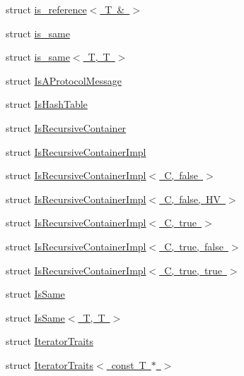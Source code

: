 \begin{DoxyCompactItemize}
struct \mbox{\hyperlink{structtesting_1_1internal_1_1is__reference_3_01_t_01_6_01_4}{is\+\_\+reference$<$ T \& $>$}}
\item 
struct \mbox{\hyperlink{structtesting_1_1internal_1_1is__same}{is\+\_\+same}}
\item 
struct \mbox{\hyperlink{structtesting_1_1internal_1_1is__same_3_01_t_00_01_t_01_4}{is\+\_\+same$<$ T, T $>$}}
\item 
struct \mbox{\hyperlink{structtesting_1_1internal_1_1_is_a_protocol_message}{Is\+A\+Protocol\+Message}}
\item 
struct \mbox{\hyperlink{structtesting_1_1internal_1_1_is_hash_table}{Is\+Hash\+Table}}
\item 
struct \mbox{\hyperlink{structtesting_1_1internal_1_1_is_recursive_container}{Is\+Recursive\+Container}}
\item 
struct \mbox{\hyperlink{structtesting_1_1internal_1_1_is_recursive_container_impl}{Is\+Recursive\+Container\+Impl}}
\item 
struct \mbox{\hyperlink{structtesting_1_1internal_1_1_is_recursive_container_impl_3_01_c_00_01false_01_4}{Is\+Recursive\+Container\+Impl$<$ C, false $>$}}
\item 
struct \mbox{\hyperlink{structtesting_1_1internal_1_1_is_recursive_container_impl_3_01_c_00_01false_00_01_h_v_01_4}{Is\+Recursive\+Container\+Impl$<$ C, false, H\+V $>$}}
\item 
struct \mbox{\hyperlink{structtesting_1_1internal_1_1_is_recursive_container_impl_3_01_c_00_01true_01_4}{Is\+Recursive\+Container\+Impl$<$ C, true $>$}}
\item 
struct \mbox{\hyperlink{structtesting_1_1internal_1_1_is_recursive_container_impl_3_01_c_00_01true_00_01false_01_4}{Is\+Recursive\+Container\+Impl$<$ C, true, false $>$}}
\item 
struct \mbox{\hyperlink{structtesting_1_1internal_1_1_is_recursive_container_impl_3_01_c_00_01true_00_01true_01_4}{Is\+Recursive\+Container\+Impl$<$ C, true, true $>$}}
\item 
struct \mbox{\hyperlink{structtesting_1_1internal_1_1_is_same}{Is\+Same}}
\item 
struct \mbox{\hyperlink{structtesting_1_1internal_1_1_is_same_3_01_t_00_01_t_01_4}{Is\+Same$<$ T, T $>$}}
\item 
struct \mbox{\hyperlink{structtesting_1_1internal_1_1_iterator_traits}{Iterator\+Traits}}
\item 
struct \mbox{\hyperlink{structtesting_1_1internal_1_1_iterator_traits_3_01const_01_t_01_5_01_4}{Iterator\+Traits$<$ const T $\ast$ $>$}}

\end{DoxyCompactItemize}
